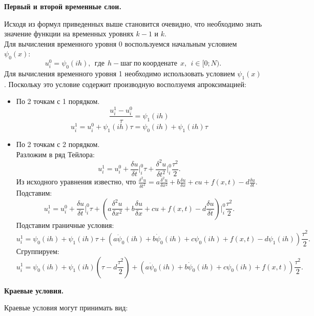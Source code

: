 \documentclass[12pt]{article}
\begin{document}
    \begin{center}  \textbf{Первый и второй временные слои.} \end{center}
    Исходя из формул приведенных выше становится очевидно, что необходимо знать значение функции на временных уровнях $k-1$ и $k$. \\
    Для вычисления временного уровня 0 воспользуемся начальным условием $\psi_0(x)$:
    $$u_i^0=\psi_0(ih),\:\:где\:\:h-шаг\:по\:коорденате\:\:x,\:\:i \in[0;N).$$
    Для вычисления временного уровня 1 необходимо использовать условием $\psi_1(x)$. Поскольку это условие содержит производную восползуемя апроксимацией:
    \begin{itemize}
        \item По 2 точкам с 1 порядком.
        $$\frac{u_i^1-u_i^0}{\tau}=\psi_1(ih)$$
        $$u_i^1=u_i^0+\psi_1(ih)\tau=\psi_0(ih)+\psi_1(ih)\tau$$
        \item По 2 точкам с 2 порядком.\\
        Разложим в ряд Тейлора:
        $$u_i^1 = u_i^0+\frac{\delta u}{\delta t}\bigg|_i^0 \tau+\frac{\delta^2 u}{\delta t^2}\bigg|_i^0\frac{\tau^2}{2}.$$
        Из исходного уравнения известно, что $\frac{\delta^2 u}{\delta t^2}=a\frac{\delta^2 u}{\delta x^2}+b\frac{\delta u}{\delta x}+cu+f(x,t)-
        d\frac{\delta u}{\delta t}$. Подставим:
        $$u_i^1 = u_i^0+\frac{\delta u}{\delta t}\bigg|_i^0 \tau+\left(a\frac{\delta^2 u}{\delta x^2}+b\frac{\delta u}{\delta x}+cu+f(x,t)-
        d\frac{\delta u}{\delta t}\right)\bigg|_i^0\frac{\tau^2}{2}.$$
        Подставим граничные условия:
        $$u_i^1 = \psi_0(ih)+\psi_1(ih) \tau+\left(a\ddot\psi_0(ih)+b\dot\psi_0(ih)+c\psi_0(ih)+f(x,t)-d\psi_1(ih)\right)\frac{\tau^2}{2}.$$
        Сгруппируем:
        $$u_i^1 = \psi_0(ih)+\psi_1(ih)(\tau-d\frac{\tau^2}{2})+\left(a\ddot\psi_0(ih)+b\dot\psi_0(ih)+c\psi_0(ih)+f(x,t)\right)\frac{\tau^2}{2}.$$

    \end{itemize}

    \begin{center}  \textbf{Краевые условия.} \end{center}
    Краевые условия могут принимать вид:
\end{document}
